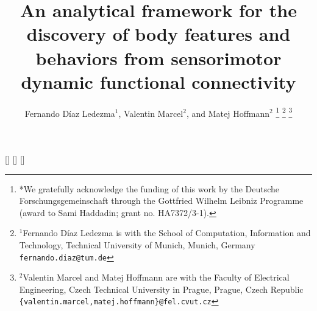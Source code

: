 \newacro{}[]{}
\newacro{}[]{}
\newacro{}[]{}

\title{\LARGE \bf
An analytical framework for the discovery of body features and behaviors from sensorimotor dynamic functional connectivity
}


\author{Fernando D\'iaz Ledezma$^{1}$, Valentin Marcel$^{2}$, and Matej Hoffmann$^{2}$%
\thanks{*We gratefully acknowledge the funding of this work by the Deutsche Forschungsgemeinschaft through the Gottfried Wilhelm Leibniz Programme (award to Sami Haddadin; grant no. HA7372/3-1).}%
\thanks{$^{1}$Fernando D\'iaz Ledezma is with the School of Computation, Information and Technology, Technical University of Munich, Munich, Germany {\tt\small fernando.diaz@tum.de}}%
\thanks{$^{2}$Valentin Marcel and Matej Hoffmann are with the Faculty of Electrical Engineering, Czech Technical University in Prague, Prague, Czech Republic
        {\tt\small \{valentin.marcel,matej.hoffmann\}@fel.cvut.cz}}%
}



